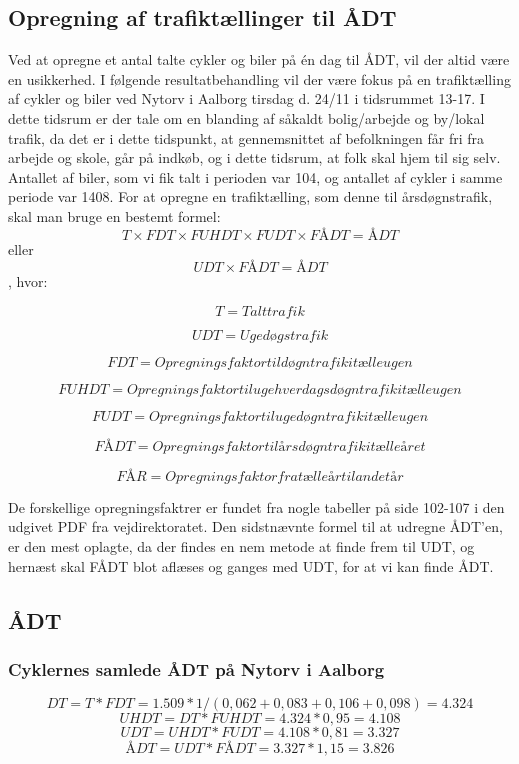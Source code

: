 \subsection{Opregning af trafiktællinger til ÅDT}
\label{sub:opregning}
Ved at opregne et antal talte cykler og biler på én dag til ÅDT, vil der altid være en usikkerhed.
I følgende resultatbehandling vil der være fokus på en trafiktælling af cykler og biler ved Nytorv i Aalborg tirsdag d. 24/11 i tidsrummet 13-17. I dette tidsrum er der tale om en blanding af såkaldt bolig/arbejde og by/lokal trafik, da det er i dette tidspunkt, at gennemsnittet af befolkningen får fri fra arbejde og skole, går på indkøb, og i dette tidsrum, at folk skal hjem til sig selv.
Antallet af biler, som vi fik talt i perioden var 104, og antallet af cykler i samme periode var 1408.
For at opregne en trafiktælling, som denne til årsdøgnstrafik, skal man bruge en bestemt formel:
$$ T \times FDT \times FUHDT \times FUDT \times FÅDT = ÅDT $$ eller $$ UDT \times FÅDT = ÅDT$$ , hvor:

$$T = Talt trafik$$

$$UDT = Ugedøgstrafik$$

$$FDT = Opregningsfaktor til døgntrafik i tælleugen$$

$$FUHDT = Opregningsfaktor til ugehverdagsdøgntrafik i tælleugen$$

$$FUDT = Opregningsfaktor til ugedøgntrafik i tælleugen$$

$$FÅDT = Opregningsfaktor til årsdøgntrafik i tælleåret$$

$$FÅR = Opregningsfaktor fra tælleår til andet år$$

De forskellige opregningsfaktrer er fundet fra nogle tabeller på side 102-107 i den udgivet PDF fra vejdirektoratet. Den sidstnævnte formel til at udregne ÅDT’en, er den mest oplagte, da der findes en nem metode at finde frem til UDT, og hernæst skal FÅDT blot aflæses og ganges med UDT, for at vi kan finde ÅDT.

\subsection{ÅDT}
\label{AEDT}
\subsubsection{Cyklernes samlede ÅDT på Nytorv i Aalborg}
$$DT = T * FDT = 1.509 * 1/(0,062 +0,083+0,106+0,098) = 4.324$$
$$UHDT = DT * FUHDT = 4.324* 0,95 = 4.108$$
$$UDT = UHDT * FUDT = 4.108* 0,81 = 3.327$$
$$ÅDT = UDT * FÅDT = 3.327 * 1,15 = 3.826$$
